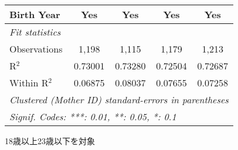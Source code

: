 \documentclass{article}
\begin{document}
\begin{threeparttable}[b]
\begin{tabular}{lcccc}
      Birth Year                                    & Yes      & Yes           & Yes            & Yes\\  
      \midrule
      \emph{Fit statistics}\\
      Observations                                  & 1,198    & 1,115         & 1,179          & 1,213\\  
      R$^2$                                         & 0.73001  & 0.73280       & 0.72504        & 0.72687\\  
      Within R$^2$                                  & 0.06875  & 0.08037       & 0.07655        & 0.07258\\  
      \midrule \midrule
      \multicolumn{5}{l}{\emph{Clustered (Mother ID) standard-errors in parentheses}}\\
      \multicolumn{5}{l}{\emph{Signif. Codes: ***: 0.01, **: 0.05, *: 0.1}}\\
   \end{tabular}
   
   \begin{tablenotes}\item 18歳以上23歳以下を対象
   \end{tablenotes}
\end{threeparttable}
\par\endgroup
\end{document}
